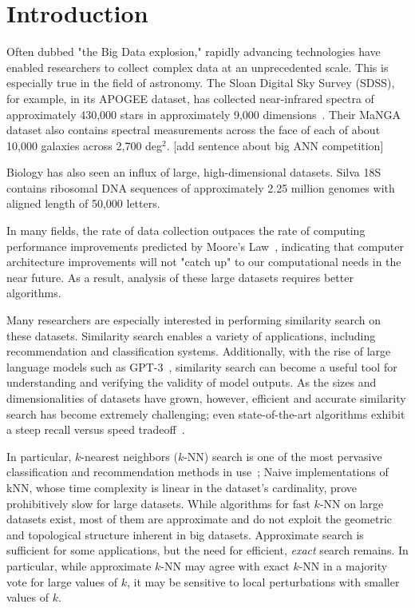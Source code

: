 \section{Introduction}
\label{sec:introduction}
Often dubbed "the Big Data explosion," rapidly advancing technologies have enabled researchers to collect complex data at an unprecedented scale. 
This is especially true in the field of astronomy. 
The Sloan Digital Sky Survey (SDSS), for example, in its APOGEE dataset, has collected near-infrared spectra of approximately 430,000 stars in approximately 9,000 dimensions~\cite{alam2015eleventh}. 
Their MaNGA dataset also contains spectral measurements across the face of each of about 10,000 galaxies across 2,700 deg$^2$. [add sentence about big ANN competition]

Biology has also seen an influx of large, high-dimensional datasets. Silva 18S contains ribosomal DNA sequences of approximately 2.25 
million genomes with aligned length of 50,000 letters. 


In many fields, the rate of data collection outpaces the rate of computing performance improvements predicted by Moore's Law~\cite{moore1965cramming}, indicating 
that computer architecture improvements will not "catch up" to our computational needs in the near future. As a result, analysis of these large datasets 
requires better algorithms. 

Many researchers are especially interested in performing similarity search on these datasets. 
Similarity search enables a variety of applications, including recommendation and classification systems. 
Additionally, with the rise of large language models such as GPT-3~\cite{brown2020language}, similarity search can become a useful tool for 
understanding and verifying the validity of model outputs. 
As the sizes and dimensionalities of datasets have grown, however, efficient and accurate similarity search has become extremely challenging; 
even state-of-the-art algorithms exhibit a steep recall versus speed tradeoff~\cite{ishaq2019clustered}.


In particular, $k$-nearest neighbors ($k$-NN) search is one of the most pervasive classification and recommendation methods in use~\cite{fix1952discriminatory, cover1967nearest}; 
Naive implementations of kNN, whose time complexity is linear in the dataset's cardinality, 
prove prohibitively slow for large datasets. While algorithms for fast $k$-NN on large datasets exist, most of them are approximate and do not 
exploit the geometric and topological structure inherent in big datasets. Approximate search is sufficient for some applications, but the 
need for efficient, \emph{exact} search remains.
In particular, while approximate $k$-NN may agree with exact $k$-NN in a majority vote for large values of $k$, it may be sensitive to local perturbations with smaller values of $k$.

